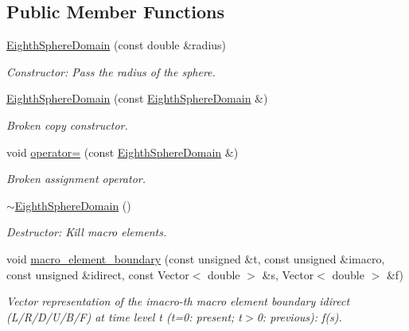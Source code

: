 \subsection*{Public Member Functions}
\begin{DoxyCompactItemize}
\item 
\hyperlink{classoomph_1_1EighthSphereDomain_a82c8a6b479e41bf07b9478e3d903b465}{Eighth\+Sphere\+Domain} (const double \&radius)
\begin{DoxyCompactList}\small\item\em Constructor\+: Pass the radius of the sphere. \end{DoxyCompactList}\item 
\hyperlink{classoomph_1_1EighthSphereDomain_af831fd06346e57808dca43940385e970}{Eighth\+Sphere\+Domain} (const \hyperlink{classoomph_1_1EighthSphereDomain}{Eighth\+Sphere\+Domain} \&)
\begin{DoxyCompactList}\small\item\em Broken copy constructor. \end{DoxyCompactList}\item 
void \hyperlink{classoomph_1_1EighthSphereDomain_a3533eb2f34986e995a779d2841267b12}{operator=} (const \hyperlink{classoomph_1_1EighthSphereDomain}{Eighth\+Sphere\+Domain} \&)
\begin{DoxyCompactList}\small\item\em Broken assignment operator. \end{DoxyCompactList}\item 
\hyperlink{classoomph_1_1EighthSphereDomain_ab299e8bd818573e3fca246973f1030b2}{$\sim$\+Eighth\+Sphere\+Domain} ()
\begin{DoxyCompactList}\small\item\em Destructor\+: Kill macro elements. \end{DoxyCompactList}\item 
void \hyperlink{classoomph_1_1EighthSphereDomain_a281727105819669ea9dab9fec120ea63}{macro\+\_\+element\+\_\+boundary} (const unsigned \&t, const unsigned \&imacro, const unsigned \&idirect, const Vector$<$ double $>$ \&s, Vector$<$ double $>$ \&f)
\begin{DoxyCompactList}\small\item\em Vector representation of the imacro-\/th macro element boundary idirect (L/\+R/\+D/\+U/\+B/F) at time level t (t=0\+: present; t$>$0\+: previous)\+: f(s). \end{DoxyCompactList}\end{DoxyCompactItemize}
